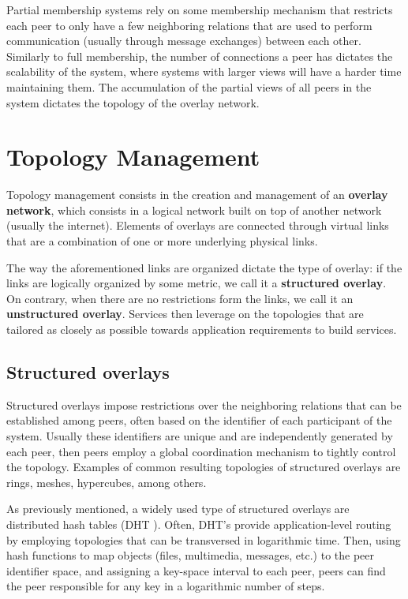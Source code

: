 
Partial membership systems rely on some membership mechanism that restricts each peer to only have a few neighboring relations that are used to perform communication (usually through message exchanges) between each other. Similarly to full membership, the number of connections a peer has  dictates the scalability of the system, where systems with larger views will have a harder time maintaining them. The accumulation of the partial views of all peers in the system dictates the topology of the overlay network.

\section{Topology Management}
\label{sec:topology_mgmt}

Topology management consists in the creation and management of an \textbf{overlay network}, which consists in a logical network built on top of another network (usually the internet). Elements of overlays are connected through virtual links that are a combination of one or more underlying physical links.

The way the aforementioned links are organized dictate the type of overlay: if the links are logically organized by some metric, we call it a \textbf{structured overlay}. On contrary, when there are no restrictions form the links, we call it an \textbf{unstructured overlay}. Services then leverage on the topologies that are tailored as closely as possible towards application requirements to build services.

\subsection{Structured overlays}

Structured overlays impose restrictions over the neighboring relations that can be established among peers, often based on the identifier of each participant of the system. Usually these identifiers are unique and are independently generated by each peer, then peers employ a global coordination mechanism to tightly control the topology. Examples of common resulting topologies of structured overlays are rings, meshes, hypercubes, among others.

As previously mentioned, a widely used type of structured overlays are distributed hash tables (DHT
). Often, DHT's provide application-level routing by employing topologies that can be transversed in logarithmic time. Then, using hash functions to map objects (files, multimedia, messages, etc.) to the peer identifier space, and assigning a key-space interval to each peer, peers can find the peer responsible for any key in a logarithmic number of steps. 

